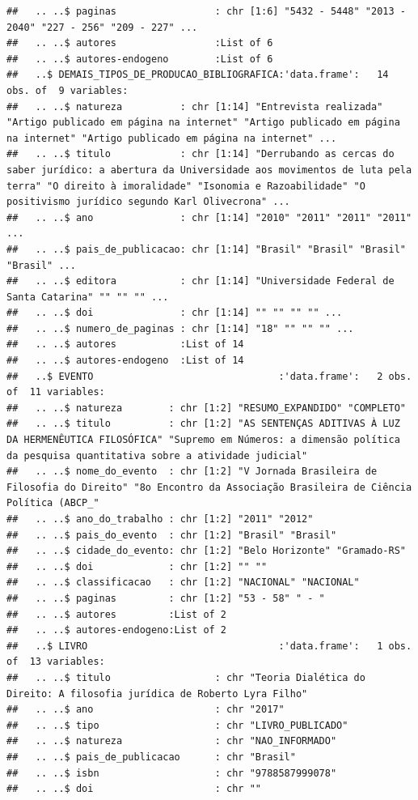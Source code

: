 \documentclass[]{article}
\begin{document}
\begin{verbatim}
##   .. ..$ paginas                 : chr [1:6] "5432 - 5448" "2013 - 2040" "227 - 256" "209 - 227" ...
##   .. ..$ autores                 :List of 6
##   .. ..$ autores-endogeno        :List of 6
##   ..$ DEMAIS_TIPOS_DE_PRODUCAO_BIBLIOGRAFICA:'data.frame':   14 obs. of  9 variables:
##   .. ..$ natureza          : chr [1:14] "Entrevista realizada" "Artigo publicado em página na internet" "Artigo publicado em página na internet" "Artigo publicado em página na internet" ...
##   .. ..$ titulo            : chr [1:14] "Derrubando as cercas do saber jurídico: a abertura da Universidade aos movimentos de luta pela terra" "O direito à imoralidade" "Isonomia e Razoabilidade" "O positivismo jurídico segundo Karl Olivecrona" ...
##   .. ..$ ano               : chr [1:14] "2010" "2011" "2011" "2011" ...
##   .. ..$ pais_de_publicacao: chr [1:14] "Brasil" "Brasil" "Brasil" "Brasil" ...
##   .. ..$ editora           : chr [1:14] "Universidade Federal de Santa Catarina" "" "" "" ...
##   .. ..$ doi               : chr [1:14] "" "" "" "" ...
##   .. ..$ numero_de_paginas : chr [1:14] "18" "" "" "" ...
##   .. ..$ autores           :List of 14
##   .. ..$ autores-endogeno  :List of 14
##   ..$ EVENTO                                :'data.frame':   2 obs. of  11 variables:
##   .. ..$ natureza        : chr [1:2] "RESUMO_EXPANDIDO" "COMPLETO"
##   .. ..$ titulo          : chr [1:2] "AS SENTENÇAS ADITIVAS À LUZ DA HERMENÊUTICA FILOSÓFICA" "Supremo em Números: a dimensão política da pesquisa quantitativa sobre a atividade judicial"
##   .. ..$ nome_do_evento  : chr [1:2] "V Jornada Brasileira de Filosofia do Direito" "8o Encontro da Associação Brasileira de Ciência Política (ABCP_"
##   .. ..$ ano_do_trabalho : chr [1:2] "2011" "2012"
##   .. ..$ pais_do_evento  : chr [1:2] "Brasil" "Brasil"
##   .. ..$ cidade_do_evento: chr [1:2] "Belo Horizonte" "Gramado-RS"
##   .. ..$ doi             : chr [1:2] "" ""
##   .. ..$ classificacao   : chr [1:2] "NACIONAL" "NACIONAL"
##   .. ..$ paginas         : chr [1:2] "53 - 58" " - "
##   .. ..$ autores         :List of 2
##   .. ..$ autores-endogeno:List of 2
##   ..$ LIVRO                                 :'data.frame':   1 obs. of  13 variables:
##   .. ..$ titulo                  : chr "Teoria Dialética do Direito: A filosofia jurídica de Roberto Lyra Filho"
##   .. ..$ ano                     : chr "2017"
##   .. ..$ tipo                    : chr "LIVRO_PUBLICADO"
##   .. ..$ natureza                : chr "NAO_INFORMADO"
##   .. ..$ pais_de_publicacao      : chr "Brasil"
##   .. ..$ isbn                    : chr "9788587999078"
##   .. ..$ doi                     : chr ""

\end{verbatim}
\end{document}
